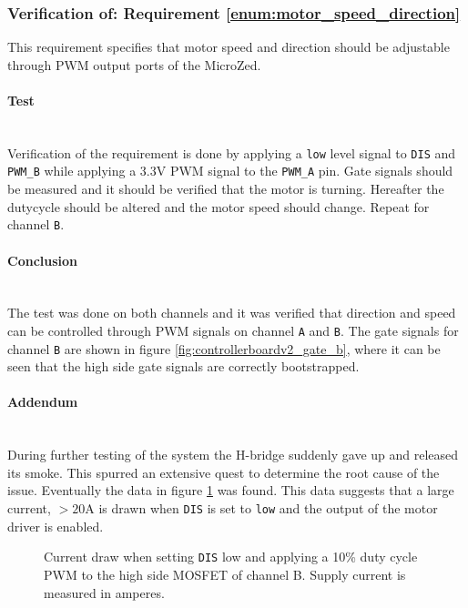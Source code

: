 \subsubsection{Verification of: Requirement \ref{enum:motor_speed_direction}} %
\label{subs:requirement_enum:motor_speed_direction}
This requirement specifies that motor speed and direction should be adjustable through PWM output ports of the MicroZed.

\paragraph{Test}~\\
Verification of the requirement is done by applying a \texttt{low} level signal to \texttt{DIS} and \texttt{PWM\_B} while applying a 3.3V PWM signal to the \texttt{PWM\_A} pin.
Gate signals should be measured and it should be verified that the motor is turning.
Hereafter the dutycycle should be altered and the motor speed should change.
Repeat for channel \texttt{B}.

\paragraph{Conclusion}~\\
The test was done on both channels and it was verified that direction and speed can be controlled through PWM signals on channel \texttt{A} and \texttt{B}.
The gate signals for channel \texttt{B} are shown in figure \ref{fig:controllerboardv2_gate_b}, where it can be seen that the high side gate signals are correctly bootstrapped.

\paragraph{Addendum}~\\
During further testing of the system the H-bridge suddenly gave up and released its smoke.
This spurred an extensive quest to determine the root cause of the issue.
Eventually the data in figure \ref{fig:current_w_load} was found.
This data suggests that a large current, $>20$A is drawn when \texttt{DIS} is set to \texttt{low} and the output of the motor driver is enabled.

\begin{figure}[h]
	\centering
	
	\caption[Main power supply current draw, 0\% duty cycle.]{Current draw when setting \texttt{DIS} low and applying a 10\% duty cycle PWM to the high side MOSFET of channel B. Supply current is measured in amperes.}
	\label{fig:current_w_load}
\end{figure}

